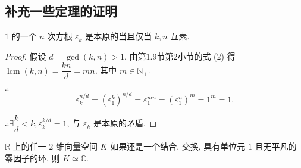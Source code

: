 \documentclass[UTF8]{ctexart}
\begin{document}
\subsection{补充一些定理的证明}
\begin{theorem}
    $1$ 的一个 $n$ 次方根 $\varepsilon_k$ 是本原的当且仅当 $k,n$ 互素.
\end{theorem}
\begin{proof}
    假设 $d=\operatorname{gcd}(k,n)>1$, 由第1.9节第2小节的式 (2) 得 $\operatorname{lcm}(k,n)=\dfrac{kn}{d}=mn$, 其中 $m\in\mathbb{N}_+$.

    $\therefore$
    \[\varepsilon_k^{n/d}=(\varepsilon_1^k)^{n/d}=\varepsilon_1^{mn}=(\varepsilon_1^n)^m=1^m=1.\]

    $\therefore\exists\dfrac{k}{d}<k,\varepsilon_k^{k/d}=1$, 与 $\varepsilon_k$ 是本原的矛盾.
\end{proof}
\begin{theorem}[书上的定理4]
    $\mathbb{R}$ 上的任一 $2$ 维向量空间 $K$ 如果还是一个结合, 交换, 具有单位元 $1$ 且无平凡的零因子的环, 则 $K\simeq\mathbb{C}$.
\end{theorem}
\end{document}
